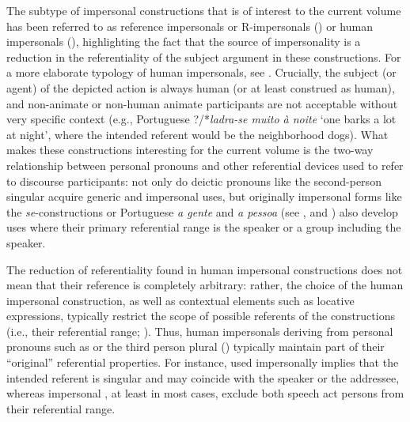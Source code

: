 \documentclass[output=paper]{langscibook}
\begin{document}
The subtype of impersonal constructions that is of interest to the current volume has been referred to as reference impersonals or R-impersonals (\citealt{SiewierskaPapastathi2011, MalchukovOgawa2011, MalchukovSiewierska2011}) or human impersonals (\citealt{CabredoHofherr2008}), highlighting the fact that the source of impersonality is a reduction in the referentiality of the subject argument in these constructions. For a more elaborate typology of human impersonals, see \citet{GastvanderAuwera2013}. Crucially, the subject (or agent) of the depicted action is always human (or at least construed as human), and non-animate or non-human animate participants are not acceptable without very specific context (e.g., Portuguese ?/*\textit{ladra-se muito à noite}  ‘one barks a lot at night’, where the intended referent would be the neighborhood dogs). What makes these constructions interesting for the current volume is the two-way relationship between personal pronouns and other referential devices used to refer to discourse participants: not only do deictic pronouns like the second-person singular acquire generic and impersonal uses, but originally impersonal forms like the \textit{se}-constructions or Portuguese \textit{a gente}  and \textit{a pessoa}  (see , and ) also develop uses where their primary referential range is the speaker or a group including the speaker.


The reduction of referentiality found in human impersonal constructions does not mean that their reference is completely arbitrary: rather, the choice of the human impersonal construction, as well as contextual elements such as locative expressions, typically restrict the scope of possible referents of the constructions (i.e., their referential range; \citealt{PosioVilkuna2013}). Thus, human impersonals deriving from personal pronouns such as  or the third person plural () typically maintain part of their “original” referential properties. For instance,  used impersonally implies that the intended referent is singular and may coincide with the speaker or the addressee, whereas impersonal , at least in most cases, exclude both speech act persons from their referential range. 
\end{document}
